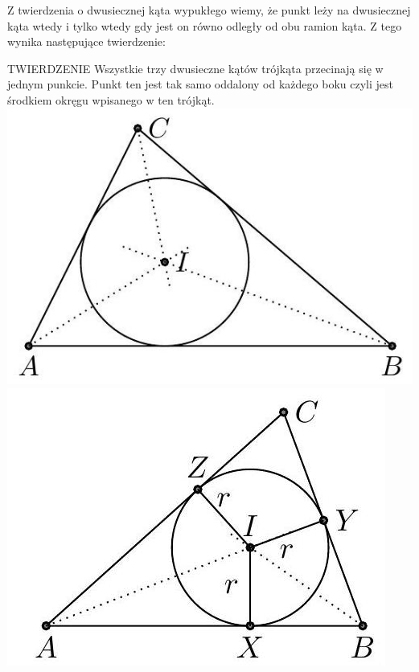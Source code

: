 \documentclass[10pt]{article}
\begin{document}
Z twierdzenia o dwusiecznej kąta wypukłego wiemy, że punkt leży na dwusiecznej kąta wtedy i tylko wtedy gdy jest on równo odległy od obu ramion kąta. Z tego wynika następujące twierdzenie:

TWIERDZENIE Wszystkie trzy dwusieczne kątów trójkąta przecinają się w jednym punkcie. Punkt ten jest tak samo oddalony od każdego boku czyli jest środkiem okręgu wpisanego w ten trójkąt.\\
\includegraphics[max width=\textwidth, center]{2024_11_21_e9b4faa005d5be2cc318g-037(2)}\\
\includegraphics[max width=\textwidth, center]{2024_11_21_e9b4faa005d5be2cc318g-038(1)}
\end{document}
